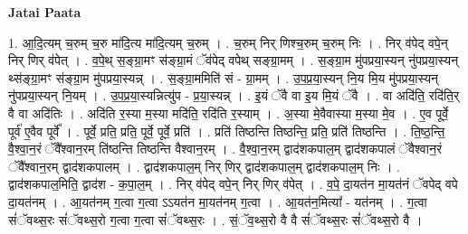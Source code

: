 \documentclass[17pt]{extarticle}
\begin{document}
\textbf{Jatai Paata} \newline

1. आ॒दि॒त्यम् च॒रुम् च॒रु मा॑दि॒त्य मा॑दि॒त्यम् च॒रुम् । . च॒रुम् निर् णिश्च॒रुम् च॒रुम् निः । . निर् व॑पेद् वपे॒न् निर् णिर् व॑पेत् । . व॒पे॒थ् स॒ङ्ग्रा॒मꣳ स॑ङ्ग्रा॒मं ॅव॑पेद् वपेथ् सङ्ग्रा॒मम् । . स॒ङ्ग्रा॒म मु॑पप्रया॒स्यन् नु॑पप्रया॒स्यन् थ्स॑ङ्ग्रा॒मꣳ स॑ङ्ग्रा॒म मु॑पप्रया॒स्यन्न् । . स॒ङ्ग्रा॒ममिति॑ सं - ग्रा॒मम् । . उ॒प॒प्र॒या॒स्यन् नि॒य मि॒य मु॑पप्रया॒स्यन् नु॑पप्रया॒स्यन् नि॒यम् । . उ॒प॒प्र॒या॒स्यन्नित्यु॑प - प्र॒या॒स्यन्न् । . इ॒यं ॅवै वा इ॒य मि॒यं ॅवै । . वा अदि॑ति॒ रदि॑ति॒र् वै वा अदि॑तिः । . अदि॑ति र॒स्या म॒स्या मदि॑ति॒ रदि॑ति र॒स्याम् । . अ॒स्या मे॒वैवास्या म॒स्या मे॒व । . ए॒व पूर्वे॒ पूर्व॑ ए॒वैव पूर्वे᳚ । . पूर्वे॒ प्रति॒ प्रति॒ पूर्वे॒ पूर्वे॒ प्रति॑ । . प्रति॑ तिष्ठन्ति तिष्ठन्ति॒ प्रति॒ प्रति॑ तिष्ठन्ति । . ति॒ष्ठ॒न्ति॒ वै॒श्वा॒न॒रं ॅवै᳚श्वान॒रम् ति॑ष्ठन्ति तिष्ठन्ति वैश्वान॒रम् । . वै॒श्वा॒न॒रम् द्वाद॑शकपाल॒म् द्वाद॑शकपालं ॅवैश्वान॒रं ॅवै᳚श्वान॒रम् द्वाद॑शकपालम् । . द्वाद॑शकपाल॒म् निर् णिर् द्वाद॑शकपाल॒म् द्वाद॑शकपाल॒म् निः । . द्वाद॑शकपाल॒मिति॒ द्वाद॑श - क॒पा॒ल॒म् । . निर् व॑पेद् वपे॒न् निर् णिर् व॑पेत् । . व॒पे॒ दा॒यत॑न मा॒यत॑नं ॅवपेद् वपे दा॒यत॑नम् । . आ॒यत॑नम् ग॒त्वा ग॒त्वा ऽऽयत॑न मा॒यत॑नम् ग॒त्वा । . आ॒यत॑न॒मित्या᳚ - यत॑नम् । . ग॒त्वा सं॑ॅवथ्स॒रः सं॑ॅवथ्स॒रो ग॒त्वा ग॒त्वा सं॑ॅवथ्स॒रः । . सं॒ॅव॒थ्स॒रो वै वै सं॑ॅवथ्स॒रः सं॑ॅवथ्स॒रो वै । \newline
\end{document}
